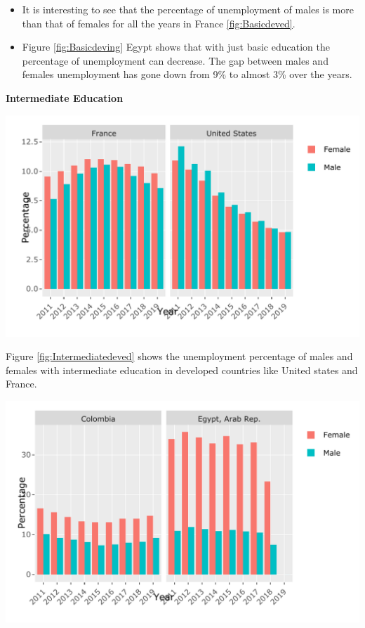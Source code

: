 \documentclass[11pt,a4paper,]{article}
\let\origfigure\figure
\let\endorigfigure\endfigure
\renewenvironment{figure}[1][2] {
    \expandafter\origfigure\expandafter[H]
} {
    \endorigfigure
}
\begin{document}
\begin{itemize}
\item
  It is interesting to see that the percentage of unemployment of males is more than that of females for all the years in France \ref{fig:Basicdeved}.
\item
  Figure \ref{fig:Basicdeving} Egypt shows that with just basic education the percentage of unemployment can decrease. The gap between males and females unemployment has gone down from 9\% to almost 3\% over the years.
\end{itemize}

\clearpage

\textbf{Intermediate Education}

\begin{figure}
\centering
\includegraphics{The_Outsiders_5513_files/figure-latex/Intermediatedeved-1.pdf}
\caption{\label{fig:Intermediatedeved}Unemployment with intermediate education in developed countries}
\end{figure}

Figure \ref{fig:Intermediatedeved} shows the unemployment percentage of males and females with intermediate education in developed countries like United states and France.

\begin{figure}
\centering
\includegraphics{The_Outsiders_5513_files/figure-latex/Intermediatedeving-1.pdf}
\caption{\label{fig:Intermediatedeving}Unemployment with intermediate education in developing countries}
\end{figure}
\end{document}
